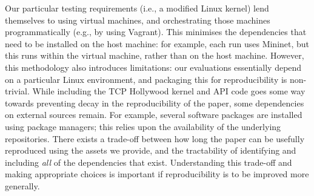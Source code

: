 \documentclass[sigconf]{acmart}
\begin{document}
Our particular testing requirements (i.e., a modified Linux kernel) lend themselves to using
virtual machines, and orchestrating those machines programmatically (e.g., by using
Vagrant). This minimises the dependencies that need to be installed on the host machine:
for example, each run uses Mininet, but this runs within the virtual machine, rather than
on the host machine. However, this methodology also introduces limitations: our
evaluations essentially depend on a particular Linux environment, and packaging this for
reproducibility is non-trivial. While including the TCP Hollywood kernel and API code
goes some way towards preventing decay in the reproducibility of the paper, some
dependencies on external sources remain. For example, several software packages are
installed using package managers; this relies upon the availability of the underlying
repositories. There exists a trade-off between how long the paper can be usefully
reproduced using the assets we provide, and the tractability of identifying and including
\emph{all} of the dependencies that exist. Understanding this trade-off and making
appropriate choices is important if reproducibility is to be improved more generally.



\end{document}
